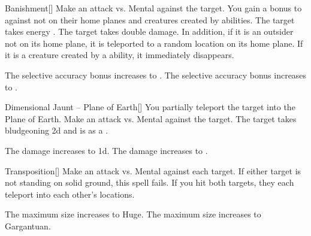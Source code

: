 \lowercase{\hypertarget{spell:Banishment}{}}\label{spell:Banishment}
\begin{freeability}[Rank 3]{\hypertarget{spell:Banishment}{Banishment}}[]
Make an attack vs. Mental against the target.
You gain a  bonus to  against  not on their home planes and creatures created by  abilities.
\hit The target takes energy .
\crit The target takes double damage.
In addition, if it is an outsider not on its home plane, it is teleported to a random location on its home plane.
If it is a creature created by a  ability, it immediately disappears.

\rankline
{} The selective accuracy bonus increases to .
 The selective accuracy bonus increases to .
\end{freeability}
\vspace{0.25em}



\lowercase{\hypertarget{spell:Dimensional Jaunt -- Plane of Earth}{}}\label{spell:Dimensional Jaunt -- Plane of Earth}
\begin{freeability}[Rank 3]{\hypertarget{spell:Dimensional Jaunt -- Plane of Earth}{Dimensional Jaunt -- Plane of Earth}}[]
You partially teleport the target into the Plane of Earth.
Make an attack vs. Mental against the target.
\hit The target takes bludgeoning  \minus2d and is  as a .

\rankline
{} The damage increases to  \minus1d.
 The damage increases to .
\end{freeability}
\vspace{0.25em}



\lowercase{\hypertarget{spell:Transposition}{}}\label{spell:Transposition}
\begin{freeability}[Rank 3]{\hypertarget{spell:Transposition}{Transposition}}[]
Make an attack vs. Mental against each target.
If either target is not standing on solid ground, this spell fails.
If you hit both targets, they each teleport into each other's locations.

\rankline
{} The maximum size increases to Huge.
 The maximum size increases to Gargantuan.
\end{freeability}
\vspace{0.25em}



